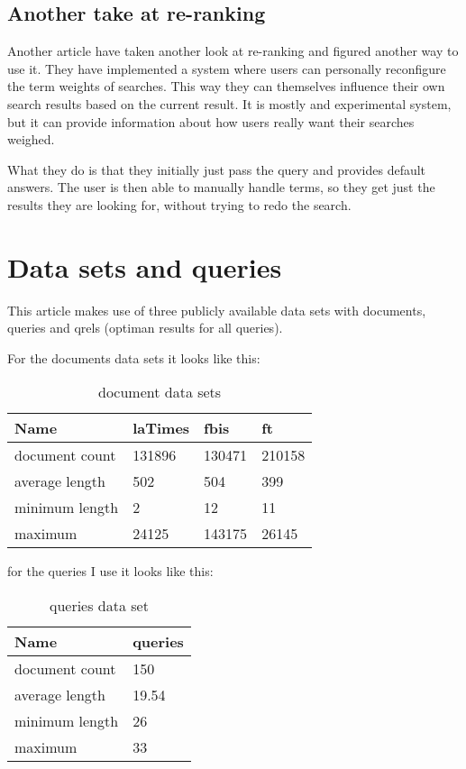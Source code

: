 \documentclass{sig-alternate}
\begin{document}
\subsection{Another take at re-ranking}
Another article\cite{review2} have taken another look at re-ranking and figured another way to use it. They have implemented a system where users can personally reconfigure the term weights of searches. This way they can themselves influence their own search results based on the current result. It is mostly and experimental system, but it can provide information about how users really want their searches weighed. 

What they do is that they initially just pass the query and provides default answers. The user is then able to manually handle terms, so they get just the results they are looking for, without trying to redo the search.

 \section{Data sets and queries}
This article makes use of three publicly available data sets with documents, queries and qrels (optiman results for all queries). 

For the documents data sets it looks like this:
\begin{table}[h!]
\centering
\caption{document data sets}
\label{my-label}
\begin{tabular}{|l|l|l|l|}
\hline
Name           & laTimes & fbis   & ft     \\ \hline
document count & 131896  & 130471 & 210158 \\ \hline
average length & 502     & 504    & 399    \\ \hline
minimum length & 2       & 12     & 11     \\ \hline
maximum        & 24125   & 143175 & 26145  \\ \hline
\end{tabular}
\end{table}

for the queries I use it looks like this:

\begin{table}[h!]
\centering
\caption{queries data set}
\label{my-label}
\begin{tabular}{|l|l|}
\hline
Name           & queries \\ \hline
document count & 150     \\ \hline
average length & 19.54   \\ \hline
minimum length & 26      \\ \hline
maximum        & 33      \\ \hline
\end{tabular}
\end{table}
\end{document}
